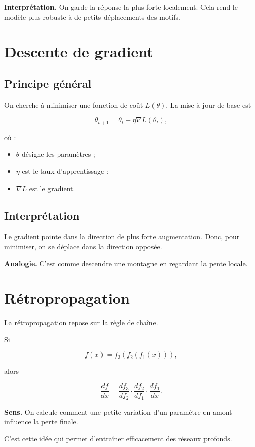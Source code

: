 ﻿\documentclass[11pt,a4paper]{article}
\begin{document}
\textbf{Interprétation.}  
On garde la réponse la plus forte localement. Cela rend le modèle plus robuste à de petits déplacements des motifs.

\section{Descente de gradient}

\subsection{Principe général}

On cherche à minimiser une fonction de coût $L(\theta)$.
La mise à jour de base est

\[
\theta_{t+1} = \theta_t - \eta \nabla L(\theta_t),
\]

où :
\begin{itemize}
    \item $\theta$ désigne les paramètres ;
    \item $\eta$ est le taux d’apprentissage ;
    \item $\nabla L$ est le gradient.
\end{itemize}

\subsection{Interprétation}

Le gradient pointe dans la direction de plus forte augmentation.
Donc, pour minimiser, on se déplace dans la direction opposée.

\textbf{Analogie.}  
C’est comme descendre une montagne en regardant la pente locale.

\section{Rétropropagation}

La rétropropagation repose sur la règle de chaîne.

Si

\[
f(x)=f_3(f_2(f_1(x))),
\]

alors

\[
\frac{df}{dx}
=
\frac{df_3}{df_2}
\cdot
\frac{df_2}{df_1}
\cdot
\frac{df_1}{dx}.
\]

\textbf{Sens.}  
On calcule comment une petite variation d’un paramètre en amont influence la perte finale.

C’est cette idée qui permet d’entraîner efficacement des réseaux profonds.
\end{document}

